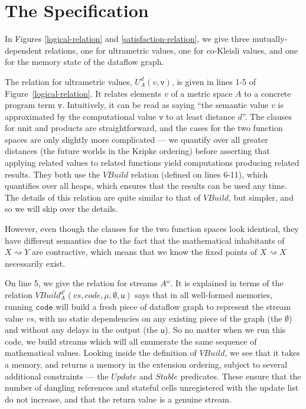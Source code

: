 \documentclass[nocopyrightspace,preprint]{sigplanconf}
\newcommand{\term}[1]{\ensuremath{\mathtt{{#1}}}}
\newcommand{\shrink}{\rightsquigarrow}
\newcommand{\Build}{\mathit{VBuild}}
\newcommand{\Update}{\mathit{Update}}
\newcommand{\Stable}{\mathit{Stable}}
\newcommand{\U}{\mathsf{u}}
\begin{document}
\section{The Specification}

In Figures \ref{logical-relation} and \ref{satisfaction-relation}, we
give three mutually-dependent relations, one for ultrametric values,
one for co-Kleisli values, and one for the memory state of the
dataflow graph. 

The relation for ultrametric values, $U^d_A(v, \term{v})$, is given in
lines 1-5 of Figure~\ref{logical-relation}. It relates elements $v$ of
a metric space $A$ to a concrete program term \term{v}. Intuitively,
it can be read as saying ``the semantic value $v$ is approximated by
the computational value \term{v} to at least distance $d$''. The
clauses for unit and products are straightforward, and the cases for
the two function spaces are only slightly more complicated --- we
quantify over all greater distances (the future worlds in the Kripke
ordering) before asserting that applying related values to related
functions yield computations producing related results. They both use
the $\Build$ relation (defined on lines 6-11), which quantifies over
all heaps, which ensures that the results can be used any time. The
details of this relation are quite similar to that of $\Build$, but
simpler, and so we will skip over the details.

However, even though the clauses for the two function spaces look
identical, they have different semantics due to the fact that the
mathematical inhabitants of $X \shrink Y$ are contractive, which means
that we know the fixed points of $X \shrink X$ necessarily exist.

On line 5, we give the relation for streams $A^\omega$. It is
explained in terms of the relation $\Build^{d'}_A(vs, code, \mu,
\emptyset, \U)$ says that in all well-formed memories, running
\term{code} will build a fresh piece of dataflow graph to represent
the stream value $vs$, with no static dependencies on any existing
piece of the graph (the $\emptyset$) and without any delays in the
output (the $\U$). So no matter when we run this code, we build
streams which will all enumerate the same sequence of mathematical
values. Looking inside the definition of $\Build$, we see that it
takes a memory, and returns a memory in the extension ordering,
subject to several additional constraints --- the $\Update$ and
$\Stable$ predicates. These ensure that the number of dangling
references and stateful cells unregistered with the update list do not
increase, and that the return value is a genuine stream.
\end{document}
